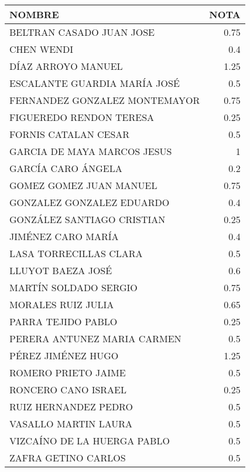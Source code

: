 \documentclass{article}
\begin{document}
\begin{tabular}{lr}
\toprule
 NOMBRE                        &   NOTA \\
\midrule
 BELTRAN CASADO JUAN JOSE      &   0.75 \\
 CHEN  WENDI                   &   0.4  \\
 DÍAZ ARROYO MANUEL            &   1.25 \\
 ESCALANTE GUARDIA MARÍA JOSÉ  &   0.5  \\
 FERNANDEZ GONZALEZ MONTEMAYOR &   0.75 \\
 FIGUEREDO RENDON TERESA       &   0.25 \\
 FORNIS CATALAN CESAR          &   0.5  \\
 GARCIA DE MAYA MARCOS JESUS   &   1    \\
 GARCÍA CARO ÁNGELA            &   0.2  \\
 GOMEZ GOMEZ JUAN MANUEL       &   0.75 \\
 GONZALEZ GONZALEZ EDUARDO     &   0.4  \\
 GONZÁLEZ SANTIAGO CRISTIAN    &   0.25 \\
 JIMÉNEZ CARO MARÍA            &   0.4  \\
 LASA TORRECILLAS CLARA        &   0.5  \\
 LLUYOT BAEZA JOSÉ             &   0.6  \\
 MARTÍN SOLDADO SERGIO         &   0.75 \\
 MORALES RUIZ JULIA            &   0.65 \\
 PARRA TEJIDO PABLO            &   0.25 \\
 PERERA ANTUNEZ MARIA  CARMEN  &   0.5  \\
 PÉREZ JIMÉNEZ HUGO            &   1.25 \\
 ROMERO PRIETO JAIME           &   0.5  \\
 RONCERO CANO ISRAEL           &   0.25 \\
 RUIZ HERNANDEZ PEDRO          &   0.5  \\
 VASALLO MARTIN LAURA          &   0.5  \\
 VIZCAÍNO DE LA HUERGA PABLO   &   0.5  \\
 ZAFRA GETINO CARLOS           &   0.5  \\
\bottomrule
\end{tabular}
\end{document}
